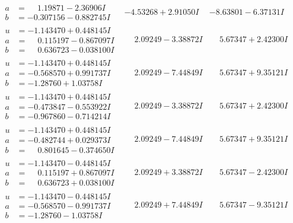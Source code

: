 \documentclass[1p]{elsarticle_modified}
\theoremstyle{definition}
\begin{document}
$$\begin{array}{c|c|c}
\begin{aligned}
a &= \phantom{-}1.19871 - 2.36906 I \\
b &= -0.307156 - 0.882745 I\end{aligned}
 & -4.53268 + 2.91050 I & -8.63801 - 6.37131 I \\ \hline\begin{aligned}
u &= -1.143470 + 0.448145 I \\
a &= \phantom{-}0.115197 - 0.867097 I \\
b &= \phantom{-}0.636723 - 0.038100 I\end{aligned}
 & \phantom{-}2.09249 - 3.38872 I & \phantom{-}5.67347 + 2.42300 I \\ \hline\begin{aligned}
u &= -1.143470 + 0.448145 I \\
a &= -0.568570 + 0.991737 I \\
b &= -1.28760 + 1.03758 I\end{aligned}
 & \phantom{-}2.09249 - 7.44849 I & \phantom{-}5.67347 + 9.35121 I \\ \hline\begin{aligned}
u &= -1.143470 + 0.448145 I \\
a &= -0.473847 - 0.553922 I \\
b &= -0.967860 - 0.714214 I\end{aligned}
 & \phantom{-}2.09249 - 3.38872 I & \phantom{-}5.67347 + 2.42300 I \\ \hline\begin{aligned}
u &= -1.143470 + 0.448145 I \\
a &= -0.482744 + 0.029373 I \\
b &= \phantom{-}0.801645 - 0.374650 I\end{aligned}
 & \phantom{-}2.09249 - 7.44849 I & \phantom{-}5.67347 + 9.35121 I \\ \hline\begin{aligned}
u &= -1.143470 - 0.448145 I \\
a &= \phantom{-}0.115197 + 0.867097 I \\
b &= \phantom{-}0.636723 + 0.038100 I\end{aligned}
 & \phantom{-}2.09249 + 3.38872 I & \phantom{-}5.67347 - 2.42300 I \\ \hline\begin{aligned}
u &= -1.143470 - 0.448145 I \\
a &= -0.568570 - 0.991737 I \\
b &= -1.28760 - 1.03758 I\end{aligned}
 & \phantom{-}2.09249 + 7.44849 I & \phantom{-}5.67347 - 9.35121 I \\ \hline\begin{aligned}

\end{aligned}
\end{array}$$
\end{document}
